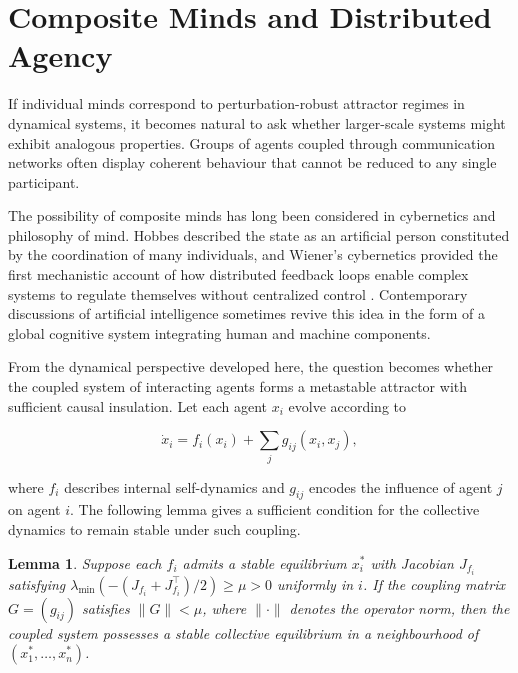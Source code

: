 \documentclass[12pt,a4paper]{article}
\theoremstyle{plain}
\newtheorem{lemma}[theorem]{Lemma}
\theoremstyle{definition}
\begin{document}
\section{Composite Minds and Distributed Agency}
\label{sec:composite}

If individual minds correspond to perturbation-robust attractor regimes in dynamical systems, it becomes natural to ask whether larger-scale systems might exhibit analogous properties. Groups of agents coupled through communication networks often display coherent behaviour that cannot be reduced to any single participant.

The possibility of composite minds has long been considered in cybernetics and philosophy of mind. Hobbes described the state as an artificial person constituted by the coordination of many individuals, and Wiener's cybernetics provided the first mechanistic account of how distributed feedback loops enable complex systems to regulate themselves without centralized control \cite{Wiener1948}. Contemporary discussions of artificial intelligence sometimes revive this idea in the form of a global cognitive system integrating human and machine components.

From the dynamical perspective developed here, the question becomes whether the coupled system of interacting agents forms a metastable attractor with sufficient causal insulation. Let each agent $x_i$ evolve according to

\begin{equation}
\dot{x}_i = f_i(x_i) + \sum_j g_{ij}(x_i, x_j),
\end{equation}

where $f_i$ describes internal self-dynamics and $g_{ij}$ encodes the influence of agent $j$ on agent $i$. The following lemma gives a sufficient condition for the collective dynamics to remain stable under such coupling.

\begin{lemma}
\label{lem:compositestability}
Suppose each $f_i$ admits a stable equilibrium $x_i^*$ with Jacobian $J_{f_i}$ satisfying $\lambda_{\min}(-(J_{f_i} + J_{f_i}^\top)/2) \geq \mu > 0$ uniformly in $i$. If the coupling matrix $G = (g_{ij})$ satisfies $\|G\| < \mu$, where $\|\cdot\|$ denotes the operator norm, then the coupled system possesses a stable collective equilibrium in a neighbourhood of $(x_1^*, \ldots, x_n^*)$.
\end{lemma}
\end{document}
